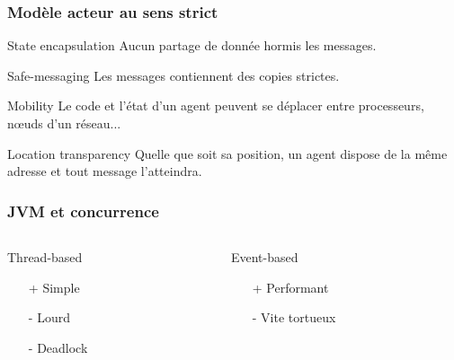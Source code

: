 \documentclass{beamer}
\begin{document}
\begin{frame}

  \frametitle{Modèle acteur au sens strict \cite{rajesh}}

  \begin{block}{State encapsulation}
    Aucun partage de donnée hormis les messages.
  \end{block}

  \begin{block}{Safe-messaging}
    Les messages contiennent des copies strictes.
  \end{block}

  \begin{block}{Mobility}
    Le code et l'état d'un agent peuvent se déplacer entre
    processeurs, n\oe uds d'un réseau...
  \end{block}

  \begin{block}{Location transparency}
    Quelle que soit sa position, un agent dispose de la même adresse
    et tout message l'atteindra.
  \end{block}

\end{frame}

\begin{frame}

  \frametitle{JVM et concurrence}

  \begin{columns}

    \begin{column}{0.5\textwidth}
      \begin{block}{Thread-based}
        \begin{itemize}
        \item[+]{Simple}
        \item[-]{Lourd}
        \item[-]{Deadlock}
        \end{itemize}
      \end{block}
    \end{column}
    
    \begin{column}{0.5\textwidth}
      \begin{block}{Event-based}
        \begin{itemize}
        \item[+]{Performant}
        \item[-]{Vite tortueux}
        \end{itemize}
      \end{block}
    \end{column}

  \end{columns}
  
\end{frame}
\end{document}
